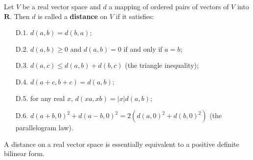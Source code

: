 Let $V$ be a real vector space and $d$ a mapping of ordered pairs of vectors of $V$ into $\mathbf{R}$. Then $d$ is called a \textbf{distance} on $V$ if it satisfies:

\begin{itemize}
\item[D.1.] $d(a, b) = d(b, a)$;
\item[D.2.] $d(a, b) \geq 0$ and $d(a, b) = 0$ if and only if $a = b$;
\item[D.3.] $d(a, c) \leq d(a, b) + d(b, c)$ (the triangle inequality);
\item[D.4.] $d(a + c, b + c) = d(a, b)$;
\item[D.5.] for any real $x$, $d(xa, xb) = |x| d(a, b)$;
\item[D.6.] $d(a + b, 0)^2 + d(a - b, 0)^2 = 2(d(a, 0)^2 + d(b, 0)^2)$ (the parallelogram law).
\end{itemize}

A distance on a real vector space is essentially equivalent to a positive definite bilinear form.
